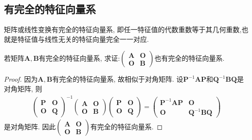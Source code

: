 \documentclass[../../main.tex]{subfiles}%
\begin{document}
\subsection{有完全的特征向量系}

矩阵或线性变换有完全的特征向量系, 即任一特征值的代数重数等于其几何重数,也就是特征值与线性无关的特征向量完全一一对应.

\begin{proposition}\label{example-6.38}
若矩阵\(\boldsymbol{A},\boldsymbol{B}\)有完全的特征向量系, 求证:\(\begin{pmatrix}
\boldsymbol{A}&\boldsymbol{O}\\
\boldsymbol{O}&\boldsymbol{B}
\end{pmatrix}\)也有完全的特征向量系.
\end{proposition}
\begin{proof}

因为\(\boldsymbol{A},\boldsymbol{B}\)有完全的特征向量系, 故相似于对角矩阵. 设\(\boldsymbol{P}^{-1}\boldsymbol{AP}\)和\(\boldsymbol{Q}^{-1}\boldsymbol{BQ}\)是对角矩阵, 则
\begin{align*}
\begin{pmatrix}
\boldsymbol{P}&\boldsymbol{O}\\
\boldsymbol{O}&\boldsymbol{Q}
\end{pmatrix}^{-1}
\begin{pmatrix}
\boldsymbol{A}&\boldsymbol{O}\\
\boldsymbol{O}&\boldsymbol{B}
\end{pmatrix}
\begin{pmatrix}
\boldsymbol{P}&\boldsymbol{O}\\
\boldsymbol{O}&\boldsymbol{Q}
\end{pmatrix}
=
\begin{pmatrix}
\boldsymbol{P}^{-1}\boldsymbol{AP}&\boldsymbol{O}\\
\boldsymbol{O}&\boldsymbol{Q}^{-1}\boldsymbol{BQ}
\end{pmatrix}
\end{align*}
是对角矩阵. 因此\(\begin{pmatrix}
\boldsymbol{A}&\boldsymbol{O}\\
\boldsymbol{O}&\boldsymbol{B}
\end{pmatrix}\)有完全的特征向量系. 

\end{proof}
\end{document}
